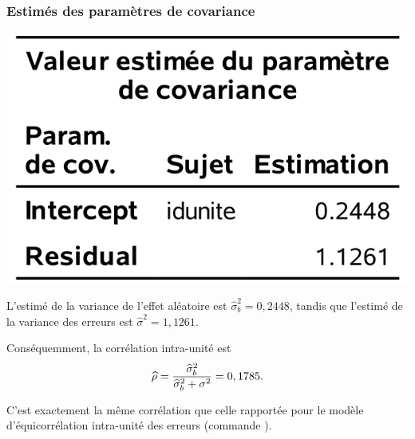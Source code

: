 \documentclass{beamer}
\begin{document}
\begin{frame}[fragile]
\frametitle{Estimés des paramètres de covariance}
\begin{center}
\includegraphics[width = 0.4\linewidth]{img/c6/diapos7-e12}
\end{center}
\bi
\item L'estimé de la variance de l'effet aléatoire est
$\hat{\sigma}^2_b=0,2448$, tandis que l'estimé de la variance des erreurs est
$\hat{\sigma}^2= 1,1261$.
\item Conséquemment, la corrélation intra-unité est
\begin{align*}
\hat{\rho}=\frac{\hat{\sigma}^2_b}{\hat{\sigma}^2_b+\sigma^2_{\vphantom{b}}}=0,1785.
\end{align*}

\item C'est exactement la même corrélation que celle rapportée pour le modèle d'équicorrélation intra-unité des erreurs (commande ).
\ei
\end{frame}
\end{document}
